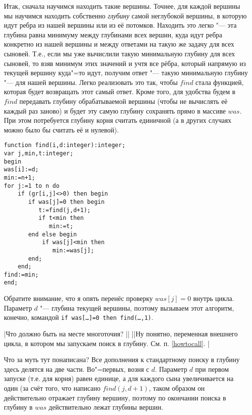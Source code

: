 Итак, сначала научимся находить такие вершины. Точнее, для каждой вершины мы научимся находить собственно
\textit{глубину} самой неглубокой вершины, в которую идут ребра из нашей вершины или из её потомков. Находить
это легко "--- эта глубина равна минимуму между глубинами всех вершин, куда идут ребра конкретно из нашей вершины
и между ответами на такую же задачу для всех сыновей. Т.е., если мы уже вычислили такую минимальную глубину
для всех сыновей, то взяв минимум этих значений и учтя все рёбра, который напрямую из текущей вершину куда"=то
идут, получим ответ "--- такую минимальную глубину "--- для нашей вершины. Легко реализовать это так, чтобы
$find$ стала функцией, которая будет возвращать этот самый ответ. Кроме того, для удобства будем в $find$ передавать
глубину обрабатываемой вершины (чтобы не вычислять её каждый раз заново) и будет эту самую глубину сохранять 
прямо в массиве $was$. При этом потребуется глубину корня считать единичной (а в других случаях можно было бы считать её
и нулевой).
\begin{codesampleo}\begin{verbatim}
function find(i,d:integer):integer;
var j,min,t:integer;
begin
was[i]:=d;
min:=n+1;
for j:=1 to n do
    if (gr[i,j]<>0) then begin
       if was[j]=0 then begin
          t:=find(j,d+1);
          if t<min then
             min:=t;
       end else begin
           if was[j]<min then
              min:=was[j];
       end;
    end;
find:=min;
end;
\end{verbatim}
\end{codesampleo}

Обратите внимание, что я опять перенёс проверку $was[j]=0$ внутрь цикла.
Параметр $d$ "--- глубина текущей вершины, поэтому вызываем этот алгоритм, конечно, командой 
\texttt{if was[\dots]=0 then find(\dots,1)}.

|Что должно быть на месте многоточия?
||
||Ну понятно, переменная внешнего цикла, в котором мы запускаем поиск в глубину. См. п. \ref{howtocall}.
|\label{dots}

Что за муть тут понаписана? Все дополнения к стандартному поиску в глубину здесь делятся на две части. 
Во"=первых, возня с $d$. Параметр $d$ при первом запуске (т.е. для корня)
равен единице, а для каждого сына увеличивается на один (за счёт того, что написано $find(j,d+1)$, 
таком образом он действительно отражает глубину вершину,
поэтому по окончании поиска в глубину в $was$ действительно лежат глубины вершин.

